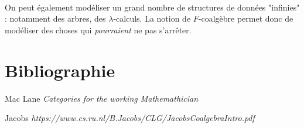 \documentclass{article}
\begin{document}
\\ 

On peut également modéliser un grand nombre de structures de données "infinies" : notamment des arbres, des $\lambda$-calculs. La notion de $F$-coalgèbre permet donc de modéliser des choses qui \textit{pourraient} ne pas s'arrêter. 
    
\section{Bibliographie}

\begin{thebibliography}{9}

Mac Lane \emph{Categories for the working Mathemathician}

Jacobs
\emph{https://www.cs.ru.nl/B.Jacobs/CLG/JacobsCoalgebraIntro.pdf}

\end{thebibliography}
\end{document}
